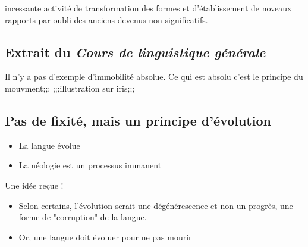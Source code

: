 incessante activité de transformation des formes et d'établissement de noveaux rapports par oubli des anciens devenus non significatifs.


\subsection{Extrait du \textit{Cours de linguistique générale}}
Il n'y a pas d'exemple d'immobilité absolue. Ce qui est absolu c'est le principe du mouvment;;;
;;;illustration sur iris;;;
 \subsection{Pas de fixité, mais un principe d'évolution}
\begin{itemize} 
         \item La langue évolue
         \item La néologie est un processus immanent
\end{itemize}

Une idée reçue !
\begin{itemize}
         \item Selon certains, l'évolution serait une dégénérescence et non un progrès, une forme de "corruption" de la langue.
         \item Or, une langue doit évoluer pour ne pas mourir
\end{itemize}









